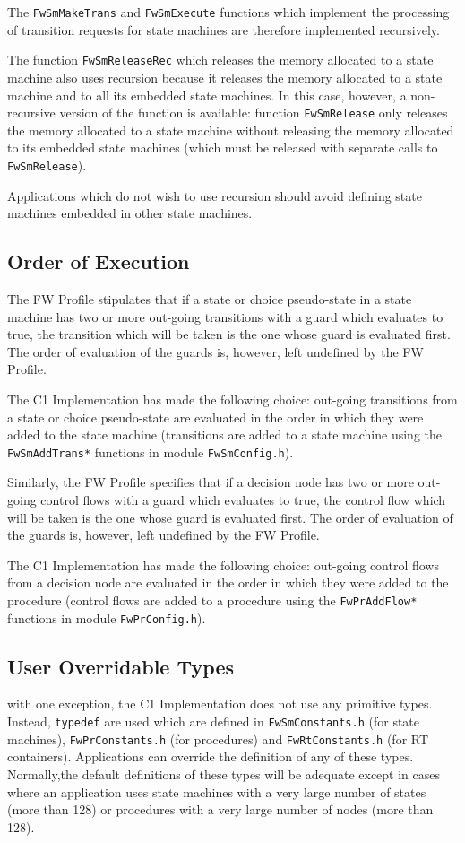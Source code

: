 \documentclass[a4paper,10pt]{article}
\begin{document}
The \texttt{FwSmMakeTrans} and \texttt{FwSmExecute} functions which implement the processing of 
transition requests for state machines are therefore implemented recursively.

The function \texttt{FwSmReleaseRec} which releases the memory allocated to a state machine also 
uses recursion because it releases the memory allocated 
to a state machine and to all its embedded state machines. In this case, however, a non-recursive 
version of the function is available: function 
\texttt{FwSmRelease} only releases the memory allocated to a state machine without releasing 
the memory allocated to its embedded state machines 
(which must be released with separate calls to \texttt{FwSmRelease}).



Applications which do not wish to use recursion should avoid defining state machines embedded 
in other state machines.

\subsection{Order of Execution}
The FW Profile stipulates that if a state or choice pseudo-state in a state machine has two or more out-going transitions with a guard which evaluates to true, the transition 
which will be taken is the one whose guard is evaluated first. The order of evaluation of the guards is, however, left undefined by the FW Profile.

The C1 Implementation has made the following choice: out-going transitions from a state 
or choice pseudo-state are evaluated in the order in which they were added to the state machine (transitions are added to a state machine using the \texttt{FwSmAddTrans*} functions in module \texttt{FwSmConfig.h}).

Similarly, the FW Profile specifies that if a decision node has two or more out-going 
control flows with a guard which evaluates to true, the control flow 
which will be taken is the one whose guard is evaluated first. The order of evaluation of the guards is, however, left undefined by the FW Profile.

The C1 Implementation has made the following choice: out-going control flows from a  
decision node are evaluated in the order in which 
they were added to the procedure (control flows are added to a procedure 
using the \texttt{FwPrAddFlow*} functions in module \texttt{FwPrConfig.h}).

\subsection{User Overridable Types}
with one exception, the C1 Implementation does not use any primitive types. Instead, \texttt{typedef} are used which are defined in \texttt{FwSmConstants.h} (for state machines), \texttt{FwPrConstants.h} (for procedures) and \texttt{FwRtConstants.h} (for RT containers). 
Applications can override the definition of any of these types.
Normally,the default definitions of these types will be adequate except in cases where an application uses state machines with a very large number of states (more than 128) or procedures with a very large number of nodes (more than 128).
\end{document}
